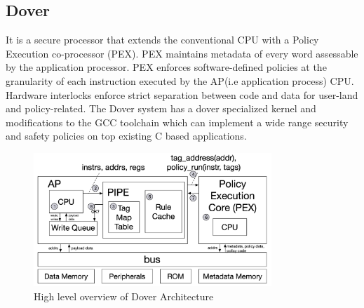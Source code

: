 \subsection{Dover \cite{Dover}}
It is a secure processor that extends the conventional CPU with
a Policy Execution co-processor (PEX). PEX maintains metadata 
of every word assessable by the application processor. PEX 
enforces software-defined policies
at the granularity of each instruction executed by the AP(i.e application process)
CPU. Hardware interlocks enforce strict separation between code and data 
for user-land and policy-related. The Dover system has 
a dover specialized kernel and modifications to the GCC toolchain 
which can implement a wide range security and safety policies on 
top existing C based applications. 

\begin{figure}[htbp!] 
  \centering    
  \includegraphics[width=0.8\textwidth]{Dover}
  \caption[Dover]{High level overview of Dover Architecture \cite{Dover}}
  \label{fig:Dover}
  \end{figure}






